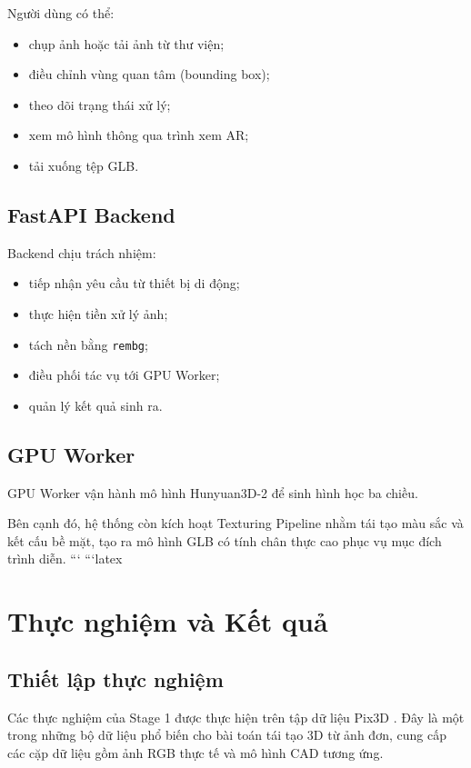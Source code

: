 \documentclass[conference,a4paper]{IEEEtran}
\begin{document}
Người dùng có thể:

\begin{itemize}
    \item chụp ảnh hoặc tải ảnh từ thư viện;
    \item điều chỉnh vùng quan tâm (bounding box);
    \item theo dõi trạng thái xử lý;
    \item xem mô hình thông qua trình xem AR;
    \item tải xuống tệp GLB.
\end{itemize}

\subsection{FastAPI Backend}

Backend chịu trách nhiệm:

\begin{itemize}
    \item tiếp nhận yêu cầu từ thiết bị di động;
    \item thực hiện tiền xử lý ảnh;
    \item tách nền bằng \texttt{rembg};
    \item điều phối tác vụ tới GPU Worker;
    \item quản lý kết quả sinh ra.
\end{itemize}

\subsection{GPU Worker}

GPU Worker vận hành mô hình Hunyuan3D-2 để sinh hình học ba chiều.

Bên cạnh đó, hệ thống còn kích hoạt Texturing Pipeline nhằm tái tạo màu sắc và kết cấu bề mặt, tạo ra mô hình GLB có tính chân thực cao phục vụ mục đích trình diễn.
```
```latex
\section{Thực nghiệm và Kết quả}

\subsection{Thiết lập thực nghiệm}

Các thực nghiệm của Stage 1 được thực hiện trên tập dữ liệu Pix3D \cite{sun}. Đây là một trong những bộ dữ liệu phổ biến cho bài toán tái tạo 3D từ ảnh đơn, cung cấp các cặp dữ liệu gồm ảnh RGB thực tế và mô hình CAD tương ứng.
\end{document}
